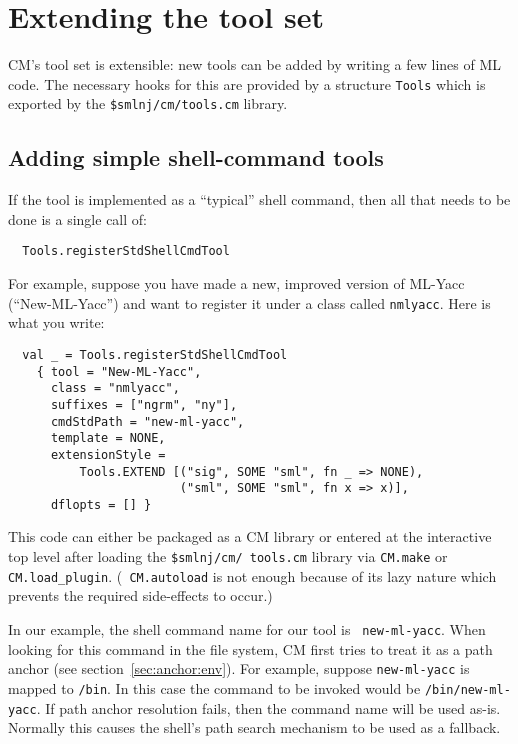 \documentclass[titlepage,letterpaper]{article}
\begin{document}
\section{Extending the tool set}
\label{sec:moretools}

CM's tool set is extensible: new tools can be added by writing a few
lines of ML code.  The necessary hooks for this are provided by a
structure {\tt Tools} which is exported by the {\tt \$smlnj/cm/tools.cm}
library.

\subsection{Adding simple shell-command tools}

If the tool is implemented as a ``typical'' shell command, then all
that needs to be done is a single call of:

\begin{verbatim}
  Tools.registerStdShellCmdTool
\end{verbatim}

For example, suppose you have made a
new, improved version of ML-Yacc (``New-ML-Yacc'') and want to
register it under a class called {\tt nmlyacc}.  Here is what you
write:

\begin{verbatim}
  val _ = Tools.registerStdShellCmdTool
    { tool = "New-ML-Yacc",
      class = "nmlyacc",
      suffixes = ["ngrm", "ny"],
      cmdStdPath = "new-ml-yacc",
      template = NONE,
      extensionStyle =
          Tools.EXTEND [("sig", SOME "sml", fn _ => NONE),
                        ("sml", SOME "sml", fn x => x)],
      dflopts = [] }
\end{verbatim}

\begin{sloppy}
This code can either be packaged as a CM library or entered at the
interactive top level after loading the {\tt \$smlnj/cm/ tools.cm}
library via {\tt CM.make} or {\tt CM.load\_plugin}.  ({\tt
CM.autoload} is not enough because of its lazy nature which prevents
the required side-effects to occur.)
\end{sloppy}

In our example, the shell command name for our tool is {\tt
new-ml-yacc}.  When looking for this command in the file system, CM
first tries to treat it as a path anchor (see
section~\ref{sec:anchor:env}).  For example, suppose {\tt new-ml-yacc} is
mapped to {\tt /bin}.  In this case the command to be
invoked would be {\tt /bin/new-ml-yacc}.  If path anchor resolution
fails, then the command name will be used as-is.  Normally this
causes the shell's path search mechanism to be used as a fallback.
\end{document}
